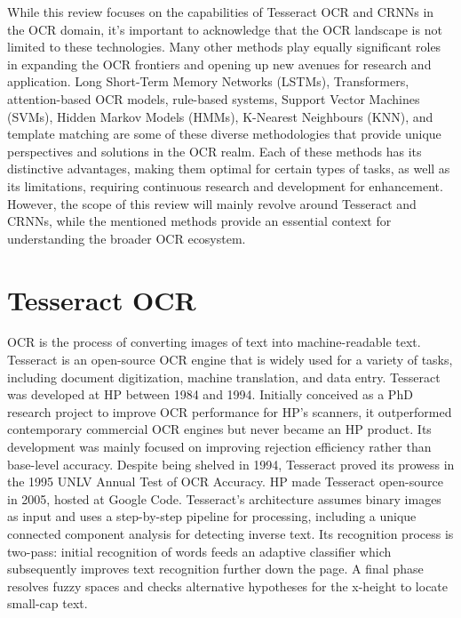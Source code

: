 While this review focuses on the capabilities of Tesseract OCR and CRNNs in the OCR domain, it's important to acknowledge that the OCR landscape is not limited to these technologies. Many other methods play equally significant roles in expanding the OCR frontiers and opening up new avenues for research and application. Long Short-Term Memory Networks (LSTMs), Transformers, attention-based OCR models, rule-based systems, Support Vector Machines (SVMs), Hidden Markov Models (HMMs), K-Nearest Neighbours (KNN), and template matching are some of these diverse methodologies that provide unique perspectives and solutions in the OCR realm. Each of these methods has its distinctive advantages, making them optimal for certain types of tasks, as well as its limitations, requiring continuous research and development for enhancement. However, the scope of this review will mainly revolve around Tesseract and CRNNs, while the mentioned methods provide an essential context for understanding the broader OCR ecosystem.

\newpage

\section{Tesseract OCR}

OCR is the process of converting images of text into machine-readable text. Tesseract is an open-source OCR engine that is widely used for a variety of tasks, including document digitization, machine translation, and data entry. Tesseract was developed at HP between 1984 and 1994. Initially conceived as a PhD research project to improve OCR performance for HP's scanners, it outperformed contemporary commercial OCR engines but never became an HP product. Its development was mainly focused on improving rejection efficiency rather than base-level accuracy. Despite being shelved in 1994, Tesseract proved its prowess in the 1995 UNLV Annual Test of OCR Accuracy. HP made Tesseract open-source in 2005, hosted at Google Code. Tesseract's architecture assumes binary images as input and uses a step-by-step pipeline for processing, including a unique connected component analysis for detecting inverse text. Its recognition process is two-pass: initial recognition of words feeds an adaptive classifier which subsequently improves text recognition further down the page. A final phase resolves fuzzy spaces and checks alternative hypotheses for the x-height to locate small-cap text. \cite{smithOverviewTesseractOCR2007}


\vspace{1cm}

